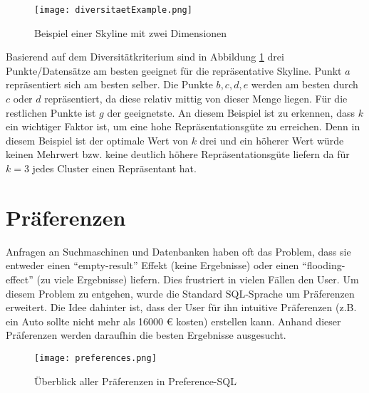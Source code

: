 \begin{figure}[H]
	\centering
	\texttt{[image: diversitaetExample.png]}
	\caption{Beispiel einer Skyline mit zwei Dimensionen}
	\label{img:diversitaetExample}
\end{figure}

Basierend auf dem Diversitätkriterium sind in Abbildung \ref{img:diversitaetExample} drei Punkte/Datensätze am besten geeignet für die repräsentative Skyline. Punkt $a$ repräsentiert sich am besten selber. Die Punkte $b,c,d,e$ werden am besten durch $c$ oder $d$ repräsentiert, da diese relativ mittig von dieser Menge liegen. Für die restlichen Punkte ist $g$ der geeignetste.
An diesem Beispiel ist zu erkennen, dass $k$ ein wichtiger Faktor ist, um eine hohe Repräsentationsgüte zu erreichen. Denn in diesem Beispiel ist der optimale Wert von $k$ drei und ein höherer Wert würde keinen Mehrwert bzw. keine deutlich höhere Repräsentationsgüte liefern da für $k=3$ jedes Cluster einen Repräsentant hat.
\section{Präferenzen}
\label{ch:Grundlagen:sec:präferenzen}
Anfragen an Suchmaschinen und Datenbanken haben oft das Problem, dass sie entweder einen \enquote{empty-result} Effekt (keine Ergebnisse) oder einen \enquote{flooding-effect} (zu viele Ergebnisse) liefern. Dies frustriert in vielen Fällen den User.
Um diesem Problem zu entgehen, wurde die Standard SQL-Sprache um Präferenzen erweitert. Die Idee dahinter ist, dass der User für ihn intuitive Präferenzen (z.B. ein Auto sollte nicht mehr als 16000 \euro{} kosten) erstellen kann. Anhand dieser Präferenzen werden daraufhin die besten Ergebnisse ausgesucht.

\begin{figure}[H]
	\centering
	\texttt{[image: preferences.png]}
	\caption{Überblick aller Präferenzen in Preference-SQL}
	\label{img:preferences}
\end{figure} 

